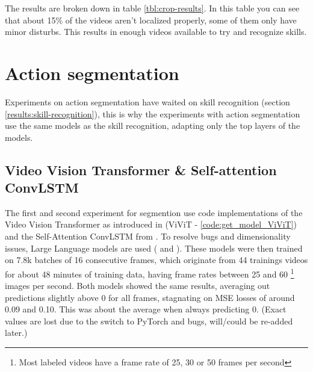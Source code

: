The results are broken down in table \ref{tbl:crop-results}. In this table you can see that about 15\% of the videos aren't localized properly, some of them only have minor disturbs. This results in enough videos available to try and recognize skills.












\section{Action segmentation}

Experiments on action segmentation have waited on skill recognition (section \ref{results:skill-recognition}), this is why the experiments with action segmentation use the same models as the skill recognition, adapting only the top layers of the models.

\subsection{Video Vision Transformer \& Self-attention ConvLSTM}
\label{subsec:video-models-from-scratch}

The first and second experiment for segmention use code implementations of the Video Vision Transformer as introduced in \textcite{Arnab2021} (ViViT - \ref{code:get_model_ViViT}) and the Self-Attention ConvLSTM from \textcite{Lin_2020}.
To resolve bugs and dimensionality issues, Large Language models are used (\autocite{OpenAI_ChatGPT_2025} and \autocite{Deepseek_2025}).
These models were then trained on 7.8k batches of 16 consecutive frames, which originate from 44 trainings videos for about 48 minutes of training data, having frame rates between 25 and 60 \footnote{Most labeled videos have a frame rate of 25, 30 or 50 frames per second} images per second.
Both models showed the same results, averaging out predictions slightly above 0 for all frames, stagnating on MSE losses of around 0.09 and 0.10. This was about the average when always predicting 0. (Exact values are lost due to the switch to PyTorch and bugs, will/could be re-added later.)


